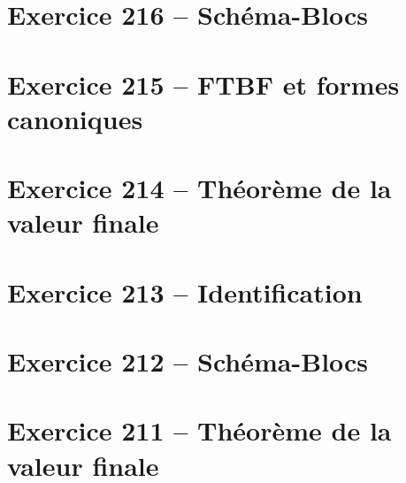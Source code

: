 \documentclass[10pt,fleqn]{article} %
\begin{document}


\vspace{1cm}

\pagestyle{fancy}
\thispagestyle{plain}

\def\columnseprulecolor{\color{ocre}}
\setlength{\columnseprule}{0.4pt} 



\newcommand{\repex}{repex}

\begin{multicols}{2}
\section*{Exercice 216 -- Schéma-Blocs}
\renewcommand{\repex}{001_SchemaBlocs}
\graphicspath{{\repex/images/}}



\section*{Exercice 215 -- FTBF et formes canoniques}
\renewcommand{\repex}{002_FTBF_Canonique}
\graphicspath{{\repex/images/}}


\section*{Exercice 214 -- Théorème de la valeur finale}
\renewcommand{\repex}{003_ValeurFinale}
\graphicspath{{\repex/images/}}


\section*{Exercice 213 -- Identification}
\renewcommand{\repex}{004_IdentificationTemporelle}
\graphicspath{{\repex/images/}}



\section*{Exercice 212 -- Schéma-Blocs}
\renewcommand{\repex}{005_SchemaBlocs2E}
\graphicspath{{\repex/images/}}


\section*{Exercice 211 -- Théorème de la valeur finale}
\renewcommand{\repex}{006_ValeurFinale2E}
\graphicspath{{\repex/images/}}



\end{multicols}
\end{document}

